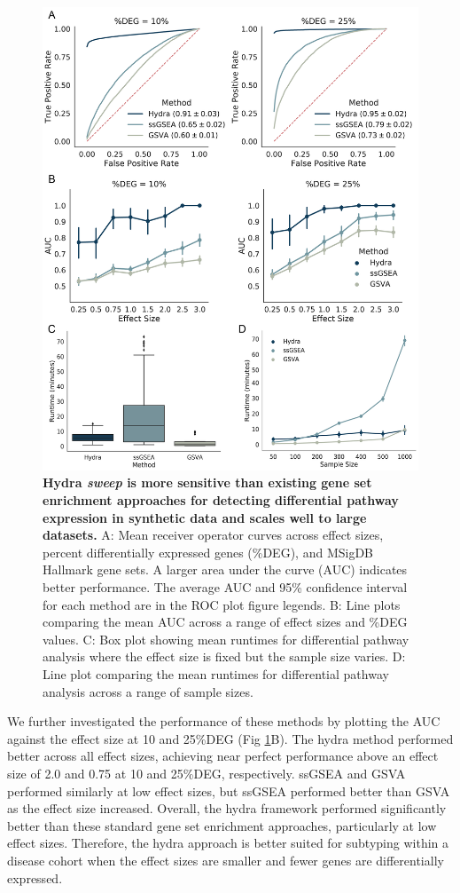\documentclass[10pt,letterpaper]{article}
\begin{document}
\begin{figure}[!h]
	\includegraphics[width=\textwidth]{img/PNG/ROC-PLOT-V2-2x}
	\caption{{\bf Hydra \textit{sweep} is more sensitive than existing gene set enrichment approaches for detecting differential pathway expression in synthetic data and scales well to large datasets.}
		A: Mean receiver operator curves across effect sizes, percent differentially expressed genes (\%DEG), and MSigDB Hallmark gene sets. A larger area under the curve (AUC) indicates better performance. The average AUC and 95\% confidence interval for each method are in the ROC plot figure legends. B: Line plots comparing the mean AUC across a range of effect sizes and \%DEG values. C: Box plot showing mean runtimes for differential pathway analysis where the effect size is fixed but the sample size varies. D: Line plot comparing the mean runtimes for differential pathway analysis across a range of sample sizes.
		\label{rocplot}}
\end{figure}

We further investigated the performance of these methods by plotting the AUC against the effect size at 10 and 25\%DEG (Fig \ref{rocplot}B). The hydra method performed better across all effect sizes, achieving near perfect performance above an effect size of 2.0 and 0.75 at 10 and 25\%DEG, respectively. ssGSEA and GSVA performed similarly at low effect sizes, but ssGSEA performed better than GSVA as the effect size increased. Overall, the hydra framework performed significantly better than these standard gene set enrichment approaches, particularly at low effect sizes. Therefore, the hydra approach is better suited for subtyping within a disease cohort when the effect sizes are smaller and fewer genes are differentially expressed.
\end{document}
